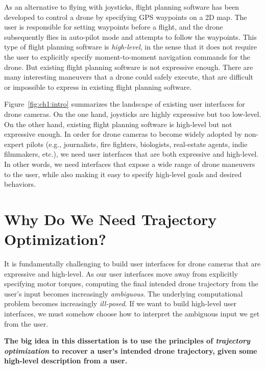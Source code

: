 As an alternative to flying with joysticks, flight planning software has been developed to control a drone by specifying GPS waypoints on a 2D map. 
The user is responsible for setting waypoints before a flight, and the drone subsequently flies in auto-pilot mode and attempts to follow the waypoints.
This type of flight planning software is \emph{high-level}, in the sense that it does not require the user to explicitly specify moment-to-moment navigation commands for the drone.
But existing flight planning software is not expressive enough.
There are many interesting maneuvers that a drone could safely execute, that are difficult or impossible to express in existing flight planning software.

Figure~\ref{fig:ch1:intro} summarizes the landscape of existing user interfaces for drone cameras.
On the one hand, joysticks are highly expressive but too low-level.
On the other hand, existing flight planning software is high-level but not expressive enough.
In order for drone cameras to become widely adopted by non-expert pilots (e.g., journalists, fire fighters, biologists, real-estate agents, indie filmmakers, etc.), we need user interfaces that are both expressive and high-level.
In other words, we need interfaces that expose a wide range of drone maneuvers to the user, while also making it easy to specify high-level goals and desired behaviors.

\section{Why Do We Need Trajectory Optimization?}

It is fundamentally challenging to build user interfaces for drone cameras that are expressive and high-level.
As our user interfaces move away from explicitly specifying motor torques, computing the final intended drone trajectory from the user's input becomes increasingly \emph{ambiguous}.
The underlying computational problem becomes increasingly \emph{ill-posed}.
If we want to build high-level user interfaces, we must somehow choose how to interpret the ambiguous input we get from the user.

\begin{tcolorbox}[before skip=20pt, after skip=20pt, sharp corners]
\begin{center}
\textbf{The big idea in this dissertation is to use the principles of \emph{trajectory optimization} to recover a user's intended drone trajectory, given some high-level description from a user.}
\end{center}
\end{tcolorbox}

